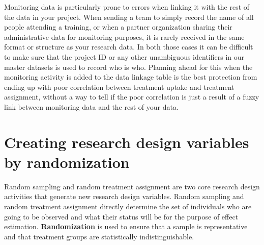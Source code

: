 Monitoring data is particularly prone to errors
when linking it with the rest of the data in your project.
When sending a team to simply record the name of all people attending a training,
or when a partner organization sharing their administrative data for monitoring purposes,
it is rarely received in the same format or structure as your research data.
In both those cases it can be difficult to make sure that
the project ID or any other unambiguous identifiers in our master datasets
is used to record who is who.
Planning ahead for this when the monitoring activity is added to the data linkage table
is the best protection from ending up with poor correlation
between treatment uptake and treatment assignment,
without a way to tell if the poor correlation is just
a result of a fuzzy link between monitoring data and the rest of your data.

\section{Creating research design variables by randomization}

Random sampling and random treatment assignment
are two core research design activities
that generate new research design variables.
Random sampling and random treatment assignment directly determine
the set of individuals who are going to be observed
and what their status will be for the purpose of effect estimation.
\textbf{Randomization}
is used to ensure that a sample is representative and
that treatment groups are statistically indistinguishable.

